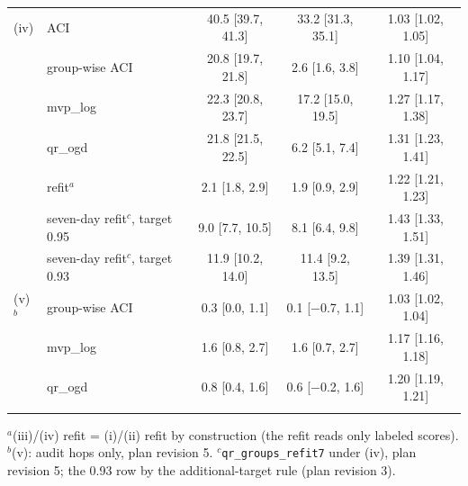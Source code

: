\begin{tabular}{@{}llccc@{}}
\addlinespace
(iv) & ACI & 40.5 [39.7, 41.3] & 33.2 [31.3, 35.1] & 1.03 [1.02, 1.05] \\
 & group-wise ACI & 20.8 [19.7, 21.8] & 2.6 [1.6, 3.8] & 1.10 [1.04, 1.17] \\
 & mvp\_log & 22.3 [20.8, 23.7] & 17.2 [15.0, 19.5] & 1.27 [1.17, 1.38] \\
 & qr\_ogd & 21.8 [21.5, 22.5] & 6.2 [5.1, 7.4] & 1.31 [1.23, 1.41] \\
 & refit$^a$ & 2.1 [1.8, 2.9] & 1.9 [0.9, 2.9] & 1.22 [1.21, 1.23] \\
 & seven-day refit$^c$, target 0.95 & 9.0 [7.7, 10.5] & 8.1 [6.4, 9.8] & 1.43 [1.33, 1.51] \\
 & seven-day refit$^c$, target 0.93 & 11.9 [10.2, 14.0] & 11.4 [9.2, 13.5] & 1.39 [1.31, 1.46] \\
\addlinespace
(v)$^b$ & group-wise ACI & 0.3 [0.0, 1.1] & 0.1 [$-$0.7, 1.1] & 1.03 [1.02, 1.04] \\
 & mvp\_log & 1.6 [0.8, 2.7] & 1.6 [0.7, 2.7] & 1.17 [1.16, 1.18] \\
 & qr\_ogd & 0.8 [0.4, 1.6] & 0.6 [$-$0.2, 1.6] & 1.20 [1.19, 1.21] \\
\addlinespace
\bottomrule
\end{tabular}

\smallskip\parbox{\linewidth}{\footnotesize $^a$(iii)/(iv) refit = (i)/(ii) refit by construction (the refit reads only labeled scores). $^b$(v): audit hops only, plan revision 5. $^c$\texttt{qr\_groups\_refit7} under (iv), plan revision 5; the 0.93 row by the additional-target rule (plan revision 3).}
